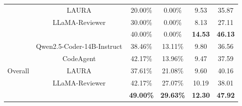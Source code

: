 \begin{table}[t]
{\begin{tabular}{cccccc}
        & LAURA & 20.00\% & 0.00\% & 9.53 & 35.87 \\
        & LLaMA-Reviewer & 30.00\% & 0.00\% & 8.13 & 27.11 \\
        & \TECH{} & 40.00\% & 0.00\% & \textbf{14.53} & \textbf{46.13} \\
      \midrule
      \multirow{5}[2]{*}{Overall}
        & Qwen2.5-Coder-14B-Instruct & 38.46\% & 13.11\% & 9.80 & 36.56 \\
        & CodeAgent & 42.17\% & 13.96\% & 9.47 & 37.59 \\
        & LAURA & 37.61\% & 21.08\% & 9.60 & 40.16 \\
        & LLaMA-Reviewer & 42.17\% & 27.07\% & 10.19 & 38.01 \\
        & \TECH{} & \textbf{49.00\%} & \textbf{29.63\%} & \textbf{12.30} & \textbf{47.92} \\
      \bottomrule
    \end{tabular}
  }
\end{table}

